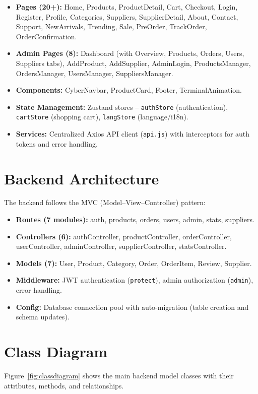 \documentclass[12pt,a4paper]{report}
\begin{document}
\begin{itemize}[noitemsep]
  \item \textbf{Pages (20+):} Home, Products, ProductDetail, Cart, Checkout, Login, Register, Profile, Categories, Suppliers, SupplierDetail, About, Contact, Support, NewArrivals, Trending, Sale, PreOrder, TrackOrder, OrderConfirmation.
  \item \textbf{Admin Pages (8):} Dashboard (with Overview, Products, Orders, Users, Suppliers tabs), AddProduct, AddSupplier, AdminLogin, ProductsManager, OrdersManager, UsersManager, SuppliersManager.
  \item \textbf{Components:} CyberNavbar, ProductCard, Footer, TerminalAnimation.
  \item \textbf{State Management:} Zustand stores -- \texttt{authStore} (authentication), \texttt{cartStore} (shopping cart), \texttt{langStore} (language/i18n).
  \item \textbf{Services:} Centralized Axios API client (\texttt{api.js}) with interceptors for auth tokens and error handling.
\end{itemize}

\section{Backend Architecture}
The backend follows the MVC (Model--View--Controller) pattern:

\begin{itemize}[noitemsep]
  \item \textbf{Routes (7 modules):} auth, products, orders, users, admin, stats, suppliers.
  \item \textbf{Controllers (6):} authController, productController, orderController, userController, adminController, supplierController, statsController.
  \item \textbf{Models (7):} User, Product, Category, Order, OrderItem, Review, Supplier.
  \item \textbf{Middleware:} JWT authentication (\texttt{protect}), admin authorization (\texttt{admin}), error handling.
  \item \textbf{Config:} Database connection pool with auto-migration (table creation and schema updates).
\end{itemize}

\section{Class Diagram}
Figure~\ref{fig:classdiagram} shows the main backend model classes with their attributes, methods, and relationships.
\end{document}
